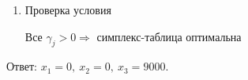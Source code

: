 \documentclass{article}
\begin{document}
\begin{enumerate}
\item Проверка условия

    Все $\gamma_j > 0 \Rightarrow$ симплекс-таблица оптимальна
\end{enumerate}

Ответ: $x_1 = 0,\ x_2 = 0,\ x_3 = 9000$.
\end{document}
